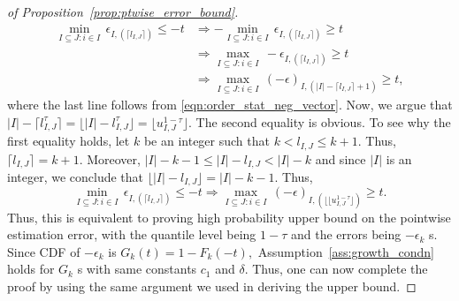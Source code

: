 \documentclass[11pt]{article}
\theoremstyle{plain}
\theoremstyle{definition}
\theoremstyle{remark}
\begin{document}
\begin{appendix}
\begin{proof}[of Proposition~\ref{prop:ptwise_error_bound}]
\begin{align*}
    \min_{I\subseteq J: i \in I}\,\epsilon_{I,(\lceil l_{I,J}\rceil)}\leq -t&\Rightarrow -\min_{I\subseteq J: i \in I}\,\epsilon_{I,(\lceil l_{I,J}\rceil)}\geq t\\
    &\Rightarrow \max_{I\subseteq J: i \in I}\,-\epsilon_{I,(\lceil l_{I,J}\rceil)}\geq t\\
    &\Rightarrow \max_{I\subseteq J: i \in I}\,(-\epsilon)_{I,(|I|-\lceil l_{I,J}\rceil+1)}\geq t,
\end{align*}
where the last line follows from \eqref{eqn:order_stat_neg_vector}. Now, we argue that $|I|-\lceil l^{\tau}_{I,J}\rceil=\lfloor |I|-l^{\tau}_{I,J}\rfloor=\lfloor u^{1-\tau}_{I,J}\rfloor.$ The second equality is obvious. To see why the first equality holds, let $k$ be an integer such that $k<l_{I,J}\leq k+1$. Thus, $\lceil l_{I,J}\rceil=k+1$. Moreover, $|I|-k-1\leq |I|-l_{I,J}<|I|-k$ and since $|I|$ is an integer, we conclude that $\lfloor |I|- l_{I,J}\rfloor=|I|-k-1$. Thus,
\[\min_{I\subseteq J: i \in I}\,\epsilon_{I,(\lceil l_{I,J}\rceil)}\leq -t\Rightarrow \max_{I\subseteq J: i \in I}\,(-\epsilon)_{I,(\lfloor \lfloor u^{1-\tau}_{I,J}\rfloor)}\geq t.\]
Thus, this is equivalent to proving high probability upper bound on the pointwise estimation error, with the quantile level being $1-\tau$ and the errors being $-\epsilon_k$ s. Since CDF of $-\epsilon_k$ is $G_k(t)=1-F_k(-t),$ Assumption~\ref{ass:growth_condn} holds for $G_k$ s with same constants $c_1$ and $\delta$. Thus, one can now complete the proof by using the same argument we used in deriving the upper bound.
 \end{proof}
\end{appendix}
\end{document}
